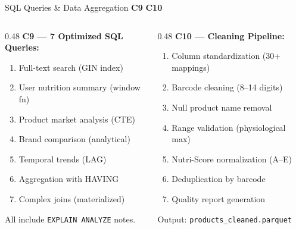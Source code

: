 \documentclass[aspectratio=169, 10pt]{beamer}
\newcommand{\competency}[1]{\textbf{\color{ntblue}#1}}
\begin{document}
\begin{frame}{SQL Queries \& Data Aggregation \competency{C9} \competency{C10}}
\begin{columns}[T]
\begin{column}{0.48\textwidth}
  \textbf{C9 --- 7 Optimized SQL Queries:}
  \begin{enumerate}\small
    \item Full-text search (GIN index)
    \item User nutrition summary (window fn)
    \item Product market analysis (CTE)
    \item Brand comparison (analytical)
    \item Temporal trends (LAG)
    \item Aggregation with HAVING
    \item Complex joins (materialized)
  \end{enumerate}
  \vspace{0.2cm}
  {\small All include \texttt{EXPLAIN ANALYZE} notes.}
\end{column}
\begin{column}{0.48\textwidth}
  \textbf{C10 --- Cleaning Pipeline:}
  \begin{enumerate}\small
    \item Column standardization (30+ mappings)
    \item Barcode cleaning (8--14 digits)
    \item Null product name removal
    \item Range validation (physiological max)
    \item Nutri-Score normalization (A--E)
    \item Deduplication by barcode
    \item Quality report generation
  \end{enumerate}
  \vspace{0.2cm}
  {\small Output: \texttt{products\_cleaned.parquet}}
\end{column}
\end{columns}

\end{frame}
\end{document}
